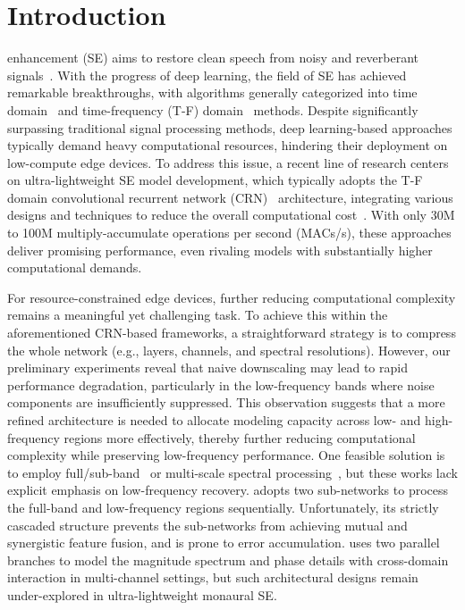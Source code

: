 \documentclass[journal]{IEEEtran}
\begin{document}
\IEEEpeerreviewmaketitle

\section{Introduction}
 enhancement (SE) aims to restore clean speech from noisy and reverberant signals~\cite{se}.
With the progress of deep learning, the field of SE has achieved remarkable breakthroughs, with algorithms generally categorized into time domain~\cite{tcnn, convtasnet, dprnn, tstnn} and time-frequency (T-F) domain~\cite{crn, dccrn, dpcrn, bsrnn, tf-gridnet, zipenhancer} methods.
Despite significantly surpassing traditional signal processing methods, deep learning-based approaches typically demand heavy computational resources, hindering their deployment on low-compute edge devices.
To address this issue, a recent line of research centers on ultra-lightweight SE model development, which typically adopts the T-F domain convolutional recurrent network (CRN)~\cite{crn} architecture, integrating various designs and techniques to reduce the overall computational cost~\cite{gtcrn, fspen, lisennet, ulunas, adaptivecrn}.
With only 30M to 100M multiply-accumulate operations per second (MACs/s), these approaches deliver promising performance, even rivaling models with substantially higher computational demands.

For resource-constrained edge devices, further reducing computational complexity remains a meaningful yet challenging task. 
To achieve this within the aforementioned CRN-based frameworks, a straightforward strategy is to compress the whole network (e.g., layers, channels, and spectral resolutions). 
However, our preliminary experiments reveal that naive downscaling may lead to rapid performance degradation, particularly in the low-frequency bands where noise components are insufficiently suppressed.
This observation suggests that a more refined architecture is needed to allocate modeling capacity across low- and high-frequency regions more effectively, thereby further reducing computational complexity while preserving low-frequency performance.
One feasible solution is to employ full/sub-band~\cite{fspen, fullsubnet} or multi-scale spectral processing~\cite{primek}, but these works lack explicit emphasis on low-frequency recovery.
\cite{firstcoarse} adopts two sub-networks to process the full-band and low-frequency regions sequentially.
Unfortunately, its strictly cascaded structure prevents the sub-networks from achieving mutual and synergistic feature fusion, and is prone to error accumulation. 
\cite{interaction} uses two parallel branches to model the magnitude spectrum and phase details with cross-domain interaction in multi-channel settings, but such architectural designs remain under-explored in ultra-lightweight monaural SE.
\end{document}
